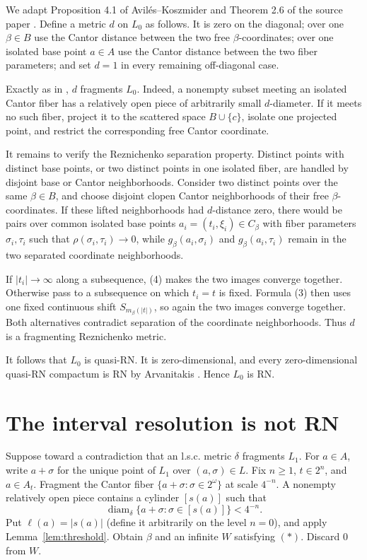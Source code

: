 \documentclass[11pt]{article}
\begin{document}
We adapt Proposition 4.1 of Avil\'es--Koszmider \cite{AK} and Theorem 2.6 of
the source paper \cite{MC}.  Define a metric $d$ on $L_0$ as follows.  It is
zero on the diagonal; over one $\beta\in B$ use the Cantor distance between
the two free $\beta$-coordinates; over one isolated base point $a\in A$ use
the Cantor distance between the two fiber parameters; and set $d=1$ in every
remaining off-diagonal case.

Exactly as in \cite[Proposition 4.1]{AK}, $d$ fragments $L_0$.  Indeed, a
nonempty subset meeting an isolated Cantor fiber has a relatively open piece
of arbitrarily small $d$-diameter.  If it meets no such fiber, project it to
the scattered space $B\cup\{c\}$, isolate one projected point, and restrict
the corresponding free Cantor coordinate.

It remains to verify the Reznichenko separation property.  Distinct points
with distinct base points, or two distinct points in one isolated fiber, are
handled by disjoint base or Cantor neighborhoods.  Consider two distinct
points over the same $\beta\in B$, and choose disjoint clopen Cantor
neighborhoods of their free $\beta$-coordinates.  If these lifted neighborhoods
had $d$-distance zero, there would be pairs over common isolated base points
$a_i=(t_i,\xi_i)\in C_\beta$ with fiber parameters $\sigma_i,\tau_i$ such that
$\rho(\sigma_i,\tau_i)\to0$, while
$g_\beta(a_i,\sigma_i)$ and $g_\beta(a_i,\tau_i)$ remain in the two separated
coordinate neighborhoods.

If $|t_i|\to\infty$ along a subsequence, (4) makes the two images converge
together.  Otherwise pass to a subsequence on which $t_i=t$ is fixed.  Formula
(3) then uses one fixed continuous shift $S_{m_\beta(|t|)}$, so again the two
images converge together.  Both alternatives contradict separation of the
coordinate neighborhoods.  Thus $d$ is a fragmenting Reznichenko metric.

It follows that $L_0$ is quasi-RN.  It is zero-dimensional, and every
zero-dimensional quasi-RN compactum is RN by Arvanitakis
\cite[Theorem 3.6]{Arv}.  Hence $L_0$ is RN.

\section{The interval resolution is not RN}

Suppose toward a contradiction that an l.s.c. metric $\delta$ fragments
$L_1$.  For $a\in A$, write $a+\sigma$ for the unique point of $L_1$ over
$(a,\sigma)\in L$.  Fix $n\ge1$, $t\in2^n$, and $a\in A_t$.  Fragment the
Cantor fiber $\{a+\sigma:\sigma\in2^\omega\}$ at scale $4^{-n}$.  A nonempty
relatively open piece contains a cylinder $[s(a)]$ such that
\[
 \operatorname{diam}_\delta\{a+\sigma:\sigma\in[s(a)]\}<4^{-n}.
\tag{5}
\]
Put $\ell(a)=|s(a)|$ (define it arbitrarily on the level $n=0$), and apply
Lemma~\ref{lem:threshold}.  Obtain $\beta$ and an infinite $W$ satisfying
$(\ast)$.  Discard $0$ from $W$.
\end{document}

